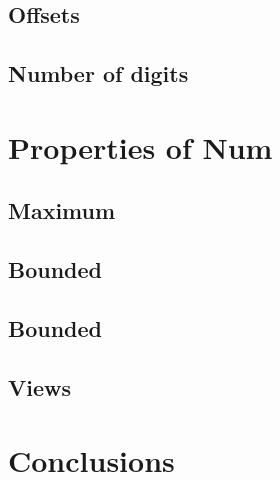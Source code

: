 \documentclass[12pt, a4paper]{article}
\begin{document}
\subsection{Offsets}
\subsection{Number of digits}

\section{Properties of Num}
\subsection{Maximum}
\subsection{Bounded}
\subsection{Bounded}
\subsection{Views}

\section{Conclusions}\label{conclusions}



\end{document}
